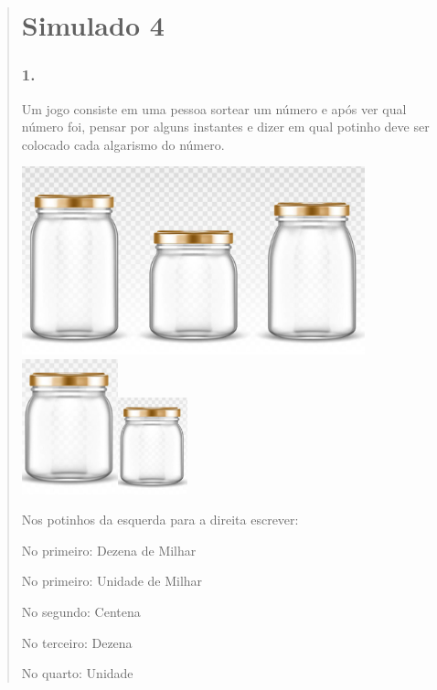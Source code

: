 \begin{enumerate}
\begin{escolha}
\begin{enumerate}
\begin{itemize}
\begin{itemize}
\begin{escolha}
\begin{quote}
\begin{escolha}
{\section{Simulado 4}\label{simulado-4}

\subsubsection{1. }\label{section-187}

Um jogo consiste em uma pessoa sortear um número e após ver qual número
foi, pensar por alguns instantes e dizer em qual potinho deve ser
colocado cada algarismo do número.

\includegraphics[width=3.90833in,height=2.14168in]{media/image163.png}
\includegraphics[width=1.10010in,height=1.54180in]{media/image164.png}\includegraphics[width=0.78333in,height=1.09785in]{media/image164.png}

Nos potinhos da esquerda para a direita escrever:

No primeiro: Dezena de Milhar

No primeiro: Unidade de Milhar

No segundo: Centena

No terceiro: Dezena

No quarto: Unidade

}
\end{escolha}
\end{quote}
\end{escolha}
\end{itemize}
\end{itemize}
\end{enumerate}
\end{escolha}
\end{enumerate}
